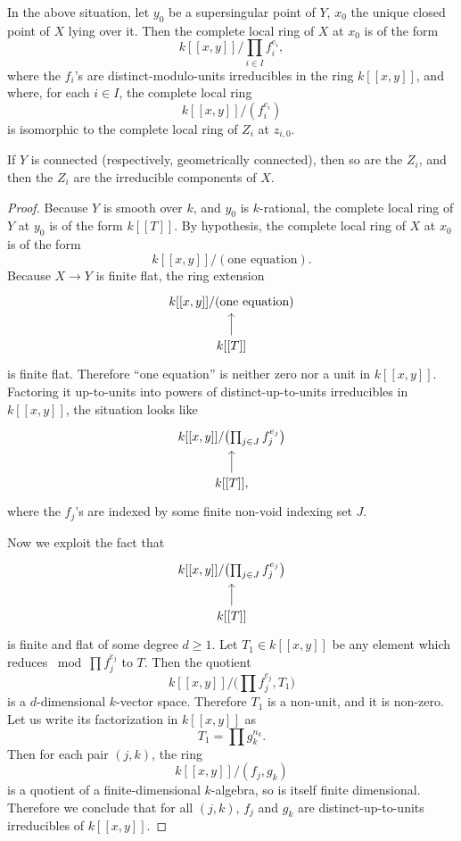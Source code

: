 \begin{crossingsthm}\label{thm:13.1.3}
In the above situation, let $y_0$ be a supersingular point of $Y$, $x_0$ the unique closed point of $X$ lying over it. Then the complete local ring of $X$ at $x_0$ is of the form
\[
k[[x, y]] \Big/ \prod_{i \in I} f_i^{e_i} ,
\]
where the $f_i$'s are distinct-modulo-units irreducibles in the ring $k[[x, y]]$, and where, for each $i \in I$, the complete local ring
\[
k[[x, y]]/(f_i^{e_i})
\]
is isomorphic to the complete local ring of $Z_i$ at $z_{i,0}$.

If $Y$ is connected (respectively, geometrically connected), then so are the $Z_i$, and then the $Z_i$ are the irreducible components of $X$.
\end{crossingsthm}

\begin{proof}
Because $Y$ is smooth over $k$, and $y_0$ is $k$-rational, the complete local ring of $Y$ at $y_0$ is of the form $k[[T]]$. By hypothesis, the complete local ring of $X$ at $x_0$ is of the form
\[
k[[x, y]]/(\text{one equation}) .
\]
Because $X \to Y$ is finite flat, the ring extension
\[
\begin{tikzcd}[row sep=1.8em]
k[[x, y]]/(\text{one equation}) \\
k[[T]] \arrow[u]
\end{tikzcd}
\]
is finite flat. Therefore ``one equation'' is neither zero nor a unit in $k[[x, y]]$. Factoring it up-to-units into powers of distinct-up-to-units irreducibles in $k[[x, y]]$, the situation looks like
\[
\begin{tikzcd}[row sep=1.8em]
k[[x, y]]/\bigl(\prod_{j \in J} f_j^{e_j}\bigr) \\
k[[T]] , \arrow[u]
\end{tikzcd}
\]
where the $f_j$'s are indexed by some finite non-void indexing set $J$.

Now we exploit the fact that
\[
\begin{tikzcd}[row sep=1.8em]
k[[x, y]]/\bigl(\prod_{j \in J} f_j^{e_j}\bigr) \\
k[[T]] \arrow[u]
\end{tikzcd}
\]
is finite and flat of some degree $d \ge 1$. Let $T_1 \in k[[x, y]]$ be any element which reduces $\bmod \prod f_j^{e_j}$ to $T$. Then the quotient
\[
k[[x, y]]/\bigl(\prod f_j^{e_j}, T_1\bigr)
\]
is a $d$-dimensional $k$-vector space. Therefore $T_1$ is a non-unit, and it is non-zero. Let us write its factorization in $k[[x, y]]$ as
\[
T_1 = \prod g_k^{n_k} .
\]
Then for each pair $(j, k)$, the ring
\[
k[[x, y]]/(f_j, g_k)
\]
is a quotient of a finite-dimensional $k$-algebra, so is itself finite dimensional. Therefore we conclude that for all $(j, k)$, $f_j$ and $g_k$ are distinct-up-to-units irreducibles of $k[[x, y]]$.


\end{proof}
